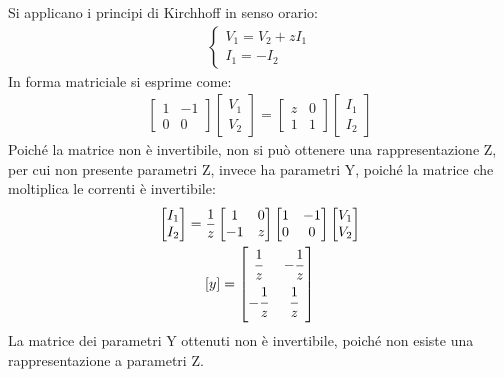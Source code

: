 \documentclass{article}
\numberwithin{equation}{subsection}
\begin{document}
Si applicano i principi di Kirchhoff in senso orario:
\begin{gather*}
    \begin{cases}
        V_1=V_2+zI_1\\
        I_1=-I_2
    \end{cases}
\end{gather*}
In forma matriciale si esprime come:
\begin{gather*}
    \begin{bmatrix}
        1&-1\\0&0
    \end{bmatrix}\begin{bmatrix}
        V_1\\V_2
    \end{bmatrix}=\begin{bmatrix}
        z&0\\1&1
    \end{bmatrix}\begin{bmatrix}
        I_1\\I_2
    \end{bmatrix}
\end{gather*}
Poiché la matrice non è invertibile, non si può ottenere una rappresentazione Z, per cui non presente parametri Z, invece ha parametri Y, poiché la matrice 
che moltiplica le correnti è invertibile:
\begin{gather*}
    \begin{bmatrix}
        I_1\\I_2
    \end{bmatrix}=\displaystyle\frac{1}{z}\begin{bmatrix}
        1&0\\-1&z
    \end{bmatrix}\begin{bmatrix}
        1&-1\\0&0
    \end{bmatrix}\begin{bmatrix}
        V_1\\V_2
    \end{bmatrix}\\
    [y]=\begin{bmatrix}
        \displaystyle\frac{\strut 1}{\strut z}&\displaystyle-\frac{\strut 1}{\strut z}\\
        \displaystyle-\frac{\strut 1}{\strut z}&\displaystyle\frac{\strut 1}{\strut z}
    \end{bmatrix}
\end{gather*}
La matrice dei parametri Y ottenuti non è invertibile, poiché non esiste una rappresentazione a parametri Z.
\end{document}

